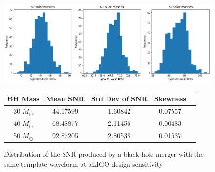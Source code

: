 \documentclass{article}
\begin{document}
\begin{figure}
    \begin{center}
        \includegraphics[width=\textwidth]{SNR5.png}
        
        \vspace{5mm}
        
        \begin{tabular}{| c | c | c | c | c | }
            \hline
            BH Mass & Mean SNR & Std Dev of SNR & Skewness \\
            \hline
            30 $M_\odot$ & 44.17599 & 1.60842 & 0.07557 \\
            40 $M_\odot$ & 68.48877 & 2.11456 & 0.00483 \\
            50 $M_\odot$ & 92.87205 & 2.80538 & 0.01637 \\
            \hline
        \end{tabular}
    \end{center}
    
    \caption{\label{fig:dist} Distribution of the SNR produced by a black hole merger with the same template waveform at aLIGO design sensitivity}
\end{figure}
\end{document}
